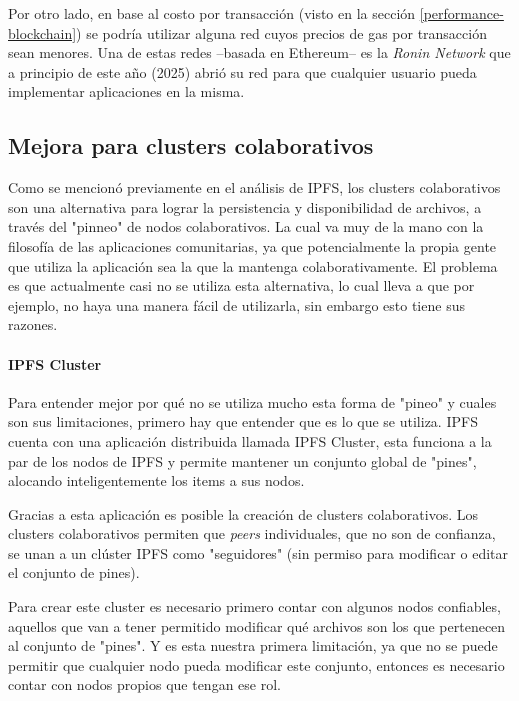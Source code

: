 Por otro lado, en base al costo por transacción (visto en la sección \ref{performance-blockchain}) se podría utilizar alguna red cuyos precios de gas por transacción sean menores. Una de estas redes --basada en Ethereum-- es la \textit{Ronin Network}\cite{ronin-network}\cite{ronin-network-whitepaper} que a principio de este año (2025) abrió su red para que cualquier usuario pueda implementar aplicaciones en la misma.

\subsection{Mejora para clusters colaborativos}
Como se mencionó previamente en el análisis de IPFS, los clusters colaborativos son una alternativa para lograr la persistencia y disponibilidad de archivos, a través del "pinneo" de nodos colaborativos. La cual va muy de la mano con la filosofía de las aplicaciones comunitarias, ya que potencialmente la propia gente que utiliza la aplicación sea la que la mantenga colaborativamente. El problema es que actualmente casi no se utiliza esta alternativa, lo cual lleva a que por ejemplo, no haya una manera fácil de utilizarla, sin embargo esto tiene sus razones.

\paragraph{IPFS Cluster}

Para entender mejor por qué no se utiliza mucho esta forma de "pineo" y cuales son sus limitaciones, primero hay que entender que es lo que se utiliza. IPFS cuenta con una aplicación distribuida llamada IPFS Cluster, esta funciona a la par de los nodos de IPFS y permite mantener un conjunto global de "pines", alocando inteligentemente los items a sus nodos.

Gracias a esta aplicación es posible la creación de clusters colaborativos. Los clusters colaborativos permiten que \textit{peers} individuales, que no son de confianza, se unan a un clúster IPFS como "seguidores" (sin permiso para modificar o editar el conjunto de pines).

Para crear este cluster es necesario primero contar con algunos nodos confiables, aquellos que van a tener permitido modificar qué archivos son los que pertenecen al conjunto de "pines". Y es esta nuestra primera limitación, ya que no se puede permitir que cualquier nodo pueda modificar este conjunto, entonces es necesario contar con nodos propios que tengan ese rol.

